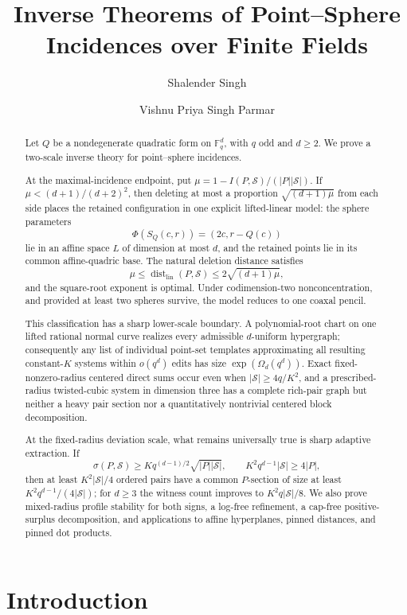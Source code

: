 \documentclass[11pt,letterpaper]{amsart}
\title{Inverse Theorems of Point--Sphere Incidences over Finite Fields}
\author{Shalender Singh}
\author{Vishnu Priya Singh Parmar}
\date{}
\theoremstyle{definition}
\theoremstyle{remark}
\newcommand{\1}{\mathbf 1}
\begin{document}
\begin{abstract}
Let $Q$ be a nondegenerate quadratic form on $\mathbb F_q^d$, with $q$ odd and $d\ge2$.  We prove a two-scale inverse theory for point--sphere incidences.

At the maximal-incidence endpoint, put $\mu=1-I(P,\mathcal S)/(|P||\mathcal S|)$.  If $\mu<(d+1)/(d+2)^2$, then deleting at most a proportion $\sqrt{(d+1)\mu}$ from each side places the retained configuration in one explicit lifted-linear model: the sphere parameters
\[
 \Phi(S_Q(c,r))=(2c,r-Q(c))
\]
lie in an affine space $L$ of dimension at most $d$, and the retained points lie in its common affine-quadric base.  The natural deletion distance satisfies
\[
 \mu\le \operatorname{dist}_{\mathrm{lin}}(P,\mathcal S)
 \le2\sqrt{(d+1)\mu},
\]
and the square-root exponent is optimal.  Under codimension-two nonconcentration, and provided at least two spheres survive, the model reduces to one coaxal pencil.

This classification has a sharp lower-scale boundary.  A polynomial-root chart on one lifted rational normal curve realizes every admissible $d$-uniform hypergraph; consequently any list of individual point-set templates approximating all resulting constant-$K$ systems within $o(q^d)$ edits has size $\exp(\Omega_d(q^d))$.  Exact fixed-nonzero-radius centered direct sums occur even when $|\mathcal S|\ge4q/K^2$, and a prescribed-radius twisted-cubic system in dimension three has a complete rich-pair graph but neither a heavy pair section nor a quantitatively nontrivial centered block decomposition.

At the fixed-radius deviation scale, what remains universally true is sharp adaptive extraction.  If
\[
 \sigma(P,\mathcal S)\ge Kq^{(d-1)/2}\sqrt{|P||\mathcal S|},
 \qquad K^2q^{d-1}|\mathcal S|\ge4|P|,
\]
then at least $K^2|\mathcal S|/4$ ordered pairs have a common $P$-section of size at least $K^2q^{d-1}/(4|\mathcal S|)$; for $d\ge3$ the witness count improves to $K^2q|\mathcal S|/8$.  We also prove mixed-radius profile stability for both signs, a log-free refinement, a cap-free positive-surplus decomposition, and applications to affine hyperplanes, pinned distances, and pinned dot products.
\end{abstract}

\maketitle

\section{Introduction}
\end{document}
